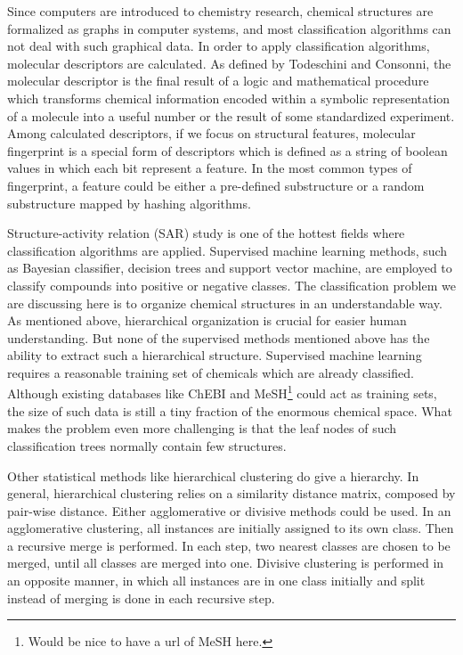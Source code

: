 \documentclass[10pt]{bmc_article}
\newenvironment{bmcformat}{\baselineskip20pt\sloppy\setboolean{publ}{false}}{\baselineskip20pt\sloppy}
\begin{document}
\begin{bmcformat}

Since computers are introduced to chemistry research, chemical structures are formalized as graphs in computer systems, and most classification algorithms can not deal with such graphical data. In order to apply classification algorithms, molecular descriptors are calculated. As defined by Todeschini and Consonni\cite{Todeschini2000}, the molecular descriptor is the final result of a logic and mathematical procedure which transforms chemical information encoded within a symbolic representation of a molecule into a useful number or the result of some standardized experiment. Among calculated descriptors, if we focus on structural features, molecular fingerprint is a special form of descriptors which is defined as a string of boolean values in which each bit represent a feature. In the most common types of fingerprint, a feature could be either a pre-defined substructure or a random substructure mapped by hashing algorithms.

Structure-activity relation (SAR) study is one of the hottest fields where classification algorithms are applied. Supervised machine learning methods, such as Bayesian classifier, decision trees and support vector machine,  are employed to classify compounds into positive or negative classes. The classification problem we are discussing here is to organize chemical structures in an understandable way. As mentioned above, hierarchical organization is crucial for easier human understanding. But none of the supervised methods mentioned above has the ability to extract such a hierarchical structure. Supervised machine learning requires a reasonable training set of chemicals which are already classified. Although existing databases like ChEBI and MeSH\footnote{Would be nice to have a url of MeSH here.} could act as training sets, the size of such data is still a tiny fraction of the enormous chemical space. What makes the problem even more challenging is that the leaf nodes of such classification trees normally contain few structures. 

Other statistical methods like hierarchical clustering\cite{Adamson1981} do give a hierarchy. In general, hierarchical clustering relies on a similarity distance matrix, composed by pair-wise distance. Either agglomerative or divisive methods could be used. In an agglomerative clustering, all instances are initially assigned to its own class. Then a recursive merge is performed. In each step, two nearest classes are chosen to be merged, until all classes are merged into one. Divisive clustering is performed in an opposite manner, in which all instances are in one class initially and split instead of merging is done in each recursive step.


\end{bmcformat}
\end{document}
